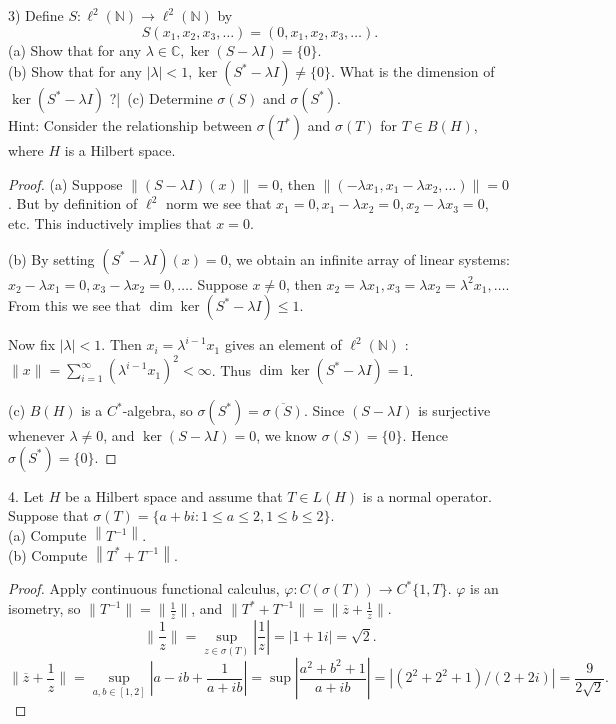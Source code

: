 \begin{problem}
	3) Define $S: \ell^2(\mathbb{N}) \rightarrow \ell^2(\mathbb{N})$ by
\[
S\left(x_1, x_2, x_3, \ldots\right)=\left(0, x_1, x_2, x_3, \ldots\right) .
\]
(a) Show that for any $\lambda \in \mathbb{C}, \operatorname{ker}(S-\lambda I)=\{0\}$.\\
(b) Show that for any $|\lambda|<1, \operatorname{ker}\left(S^*-\lambda I\right) \neq\{0\}$. What is the dimension of $\operatorname{ker}\left(S^*-\lambda I\right)$ ?|\
(c) Determine $\sigma(S)$ and $\sigma\left(S^*\right)$.\\
Hint: Consider the relationship between $\sigma\left(T^*\right)$ and $\sigma(T)$ for $T \in B(H)$, where $H$ is a Hilbert space.
\end{problem}
\begin{proof}
	(a) Suppose $\|(S - \lambda I) (x)\|= 0$, then $\|\left( -\lambda x_1, x_1 - \lambda x_2, \ldots \right) \| = 0$. But by definition of $\ell^2$ norm we see that $x_1 = 0, x_1 - \lambda x_2 = 0, x_2 - \lambda x_3 = 0$, etc. This inductively implies that $x = 0$.

	(b) By setting $(S^* - \lambda I)(x) = 0$, we obtain an infinite array of linear systems: $x_2 - \lambda x_1 = 0, x_3 - \lambda x_2 = 0, \ldots$. Suppose $x \neq 0$, then $x_2 = \lambda x_1, x_3 = \lambda x_2 = \lambda^2 x_1, \ldots$. From this we see that $\operatorname{dim} \operatorname{ker} (S^* - \lambda I) \le 1$.

	Now fix $|\lambda| < 1$. Then $x_i = \lambda^{i - 1} x_1$ gives an element of $\ell^2(\mathbb{N})$ : $\|x\| = \sum_{i = 1}^\infty  (\lambda^{i - 1} x_1)^2 < \infty $. Thus  $\operatorname{dim} \operatorname{ker} (S^* - \lambda I) = 1$.

	(c) $B(H)$ is a $C^*$-algebra, so $\sigma(S^*) = \overline{\sigma(S)} $. Since $(S - \lambda I)$ is surjective whenever $\lambda \neq 0$, and $\operatorname{ker}  (S - \lambda I) = 0$, we  know $\sigma(S) = \{0\} $. Hence $\sigma(S^*) = \{0\} $.
\end{proof}

\begin{problem}
	4. Let $H$ be a Hilbert space and assume that $T \in L(H)$ is a normal operator. Suppose that $\sigma(T)=\{a+b i: 1 \leq a \leq 2,1 \leq b \leq 2\}$.\\
(a) Compute $\left\|T^{-1}\right\|$.\\
(b) Compute $\left\|T^*+T^{-1}\right\|$.
\end{problem}
\begin{proof}
	Apply continuous functional calculus, $\varphi: C(\sigma(T)) \to  C^*\{1, T\} $. $\varphi$ is an isometry, so $\|T^{-1}\| = \|\frac{1}{z}\|$, and $\|T^* + T^{-1}\| = \|\overline{z}  + \frac{1}{z}\|$.
	\[
		\|\frac{1}{z}\| = \sup _{z \in \sigma\left(T \right) } |\frac{1}{z}| = |1 + 1 i| = \sqrt{2} 
	.\] 
	\[
		\|\overline{z}  +\frac{1}{z}\|
		= \sup _{a, b \in [1,2]} \left| a - i b + \frac{1}{a + i b} \right| 
		= \sup \left| \frac{a^2 + b^2 + 1}{ a + i b} \right| 
		= \left| (2^2 + 2^2 + 1) / (2 + 2 i) \right| 
		= \frac{9}{2 \sqrt{2} }
	.\] 
\end{proof}


